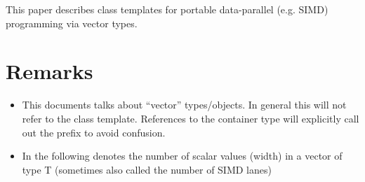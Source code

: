 \newcommand\wgTitle{Data-Parallel Vector Types \& Operations}
\newcommand\wgName{Matthias Kretz <kretz@compeng.uni-frankfurt.de>}
\newcommand\wgVersion{Version 1}
\newcommand\wgDocumentNumber{D0XXXR0}
\newcommand\wgPreviousDocumentNumber{N4184, N4185, N4395}
\newcommand\wgAcknowledgements{
  This work was supported by GSI Helmholtzzentrum für Schwerionenforschung
  and the Hessian LOEWE initiative through the Helmholtz International Center
  for FAIR (HIC for FAIR).
}

\usepackage{underscore}
\usepackage{typenames}
\usepackage{mymacros}
\usepackage{wg21}



\newcommand\datapar{\type{datapar}\xspace}
\newcommand\valuetype{\type{value\_type}\xspace}
\newcommand\simdcast{\code{datapar\_cast}\xspace}
\newcommand\mask{\type{mask}\xspace}


\begin{wgTitlepage}
  This paper describes class templates for portable data-parallel (e.g. SIMD) programming via vector types.
\end{wgTitlepage}

\pagestyle{scrheadings}
\addtocounter{section}{-1}
\section{Remarks}
\begin{itemize}
  \item This documents talks about “vector” types/objects.
    In general this will not refer to the \std{} class template.
    References to the container type will explicitly call out the  prefix to avoid confusion.
  \item In the following  denotes the number of scalar values (width) in a vector of type \type T (sometimes also called the number of SIMD lanes)
\end{itemize}





